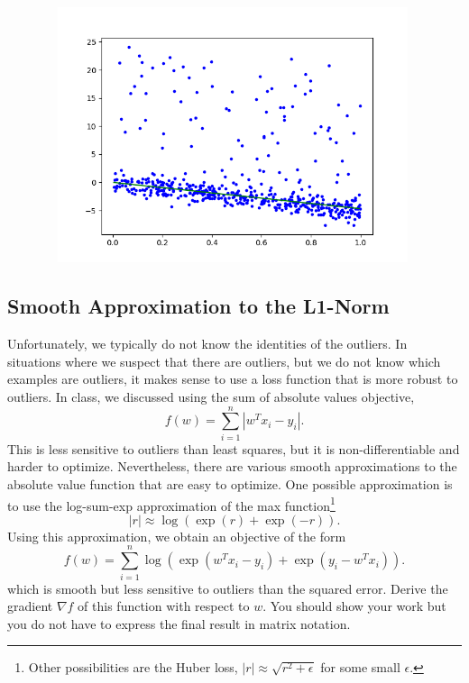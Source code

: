 \documentclass{article}
\def\blu#1{{\color{blu}#1}}
\begin{document}
\begin{figure}[h!]
  \includegraphics[width=30em,height=7.5cm]{a2_q5_1.png}

\end{figure}



\subsection{Smooth Approximation to the L1-Norm}

Unfortunately, we typically do not know the identities of the outliers. In situations where we suspect that there are outliers, but we do not know which examples are outliers, it makes sense to use a loss function that is more robust to outliers. In class, we discussed using the sum of absolute values objective,
\[
f(w) = \sum_{i=1}^n |w^Tx_i - y_i|.
\]
This is less sensitive to outliers than least squares, but it is non-differentiable and harder to optimize. Nevertheless, there are various smooth approximations to the absolute value function that are easy to optimize. One possible approximation is to use the log-sum-exp approximation of the max function\footnote{Other possibilities are the Huber loss, $|r| \approx \sqrt{r^2 + \epsilon}$ for some small $\epsilon$.}
\[
|r| \approx \log(\exp(r) + \exp(-r)).
\]
Using this approximation, we obtain an objective of the form
\[
f(w) = \sum_{i=1}^n  \log\left(\exp(w^Tx_i - y_i) + \exp(y_i - w^Tx_i)\right).
\]
which is smooth but less sensitive to outliers than the squared error. \blu{Derive
 the gradient $\nabla f$ of this function with respect to $w$. You should show your work but you do not have to express the final result in matrix notation.}
\end{document}
